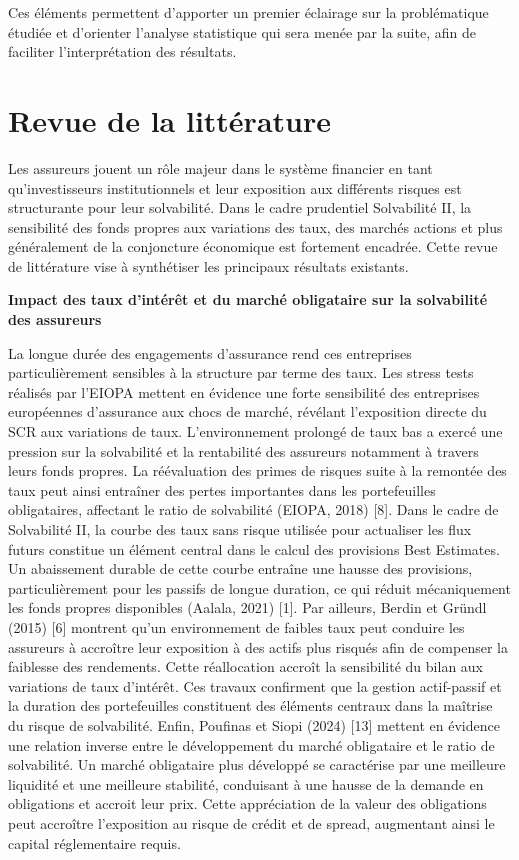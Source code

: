 \documentclass[
]{article}
\begin{document}
Ces éléments permettent d'apporter un premier éclairage sur la
problématique étudiée et d'orienter l'analyse statistique qui sera menée
par la suite, afin de faciliter l'interprétation des résultats.

\section{Revue de la littérature}\label{revue-de-la-littuxe9rature}

Les assureurs jouent un rôle majeur dans le système financier en tant
qu'investisseurs institutionnels et leur exposition aux différents
risques est structurante pour leur solvabilité. Dans le cadre prudentiel
Solvabilité II, la sensibilité des fonds propres aux variations des
taux, des marchés actions et plus généralement de la conjoncture
économique est fortement encadrée. Cette revue de littérature vise à
synthétiser les principaux résultats existants.

\textbf{Impact des taux d'intérêt et du marché obligataire sur la
solvabilité des assureurs}

La longue durée des engagements d'assurance rend ces entreprises
particulièrement sensibles à la structure par terme des taux. Les stress
tests réalisés par l'EIOPA mettent en évidence une forte sensibilité des
entreprises européennes d'assurance aux chocs de marché, révélant
l'exposition directe du SCR aux variations de taux. L'environnement
prolongé de taux bas a exercé une pression sur la solvabilité et la
rentabilité des assureurs notamment à travers leurs fonds propres. La
réévaluation des primes de risques suite à la remontée des taux peut
ainsi entraîner des pertes importantes dans les portefeuilles
obligataires, affectant le ratio de solvabilité (EIOPA, 2018) {[}8{]}.
Dans le cadre de Solvabilité II, la courbe des taux sans risque utilisée
pour actualiser les flux futurs constitue un élément central dans le
calcul des provisions Best Estimates. Un abaissement durable de cette
courbe entraîne une hausse des provisions, particulièrement pour les
passifs de longue duration, ce qui réduit mécaniquement les fonds
propres disponibles (Aalala, 2021) {[}1{]}. Par ailleurs, Berdin et
Gründl (2015) {[}6{]} montrent qu'un environnement de faibles taux peut
conduire les assureurs à accroître leur exposition à des actifs plus
risqués afin de compenser la faiblesse des rendements. Cette
réallocation accroît la sensibilité du bilan aux variations de taux
d'intérêt. Ces travaux confirment que la gestion actif-passif et la
duration des portefeuilles constituent des éléments centraux dans la
maîtrise du risque de solvabilité. Enfin, Poufinas et Siopi (2024)
{[}13{]} mettent en évidence une relation inverse entre le développement
du marché obligataire et le ratio de solvabilité. Un marché obligataire
plus développé se caractérise par une meilleure liquidité et une
meilleure stabilité, conduisant à une hausse de la demande en
obligations et accroit leur prix. Cette appréciation de la valeur des
obligations peut accroître l'exposition au risque de crédit et de
spread, augmentant ainsi le capital réglementaire requis.
\end{document}
